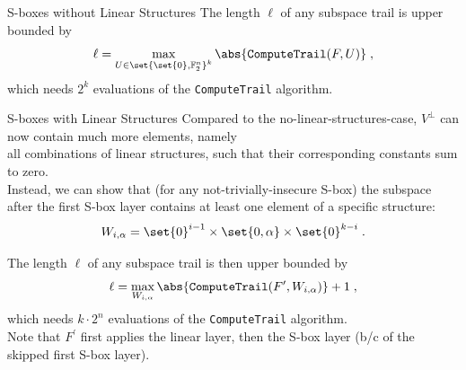 \documentclass[%
    10pt,
    professionalfont,
    aspectratio=169,
]{beamer}
\newcommand{\F}{\mathbb{F}}
\begin{document}
\begin{frame}{S-boxes without Linear Structures}
    \centering
    The length $\ell$ of any subspace trail is upper bounded by
    \begin{equation*}
        \ell = \max_{U \in \set{\set{0}, \F_2^n}^k} \abs{\texttt{ComputeTrail}(F, U)}\;,
    \end{equation*}
    which needs $2^k$ evaluations of the \texttt{ComputeTrail} algorithm.
\end{frame}

\begin{frame}{S-boxes with Linear Structures}
    \centering
    Compared to the no-linear-structures-case, $V^\perp$ can now contain much more elements, namely\\
    all combinations of linear structures, such that their corresponding constants sum to zero.\\[1em]

    Instead, we can show that (for any not-trivially-insecure S-box) the subspace\\
    after the first S-box layer contains at least one element of a specific structure:
    \begin{equation*}
        W_{i,\alpha} = \set{0}^{i-1} \times \set{0, \alpha} \times \set{0}^{k-i}\;.
    \end{equation*}

    The length $\ell$ of any subspace trail is then upper bounded by
    \begin{equation*}
        \ell = \max_{W_{i,\alpha}} \abs{\texttt{ComputeTrail}(F^\prime, W_{i,\alpha})} + 1\;,
    \end{equation*}
    which needs $k \cdot 2^n$ evaluations of the \texttt{ComputeTrail} algorithm.\\[1em]

    Note that $F^\prime$ first applies the linear layer, then the S-box layer (b/c of the skipped first S-box layer).
\end{frame}
\end{document}
